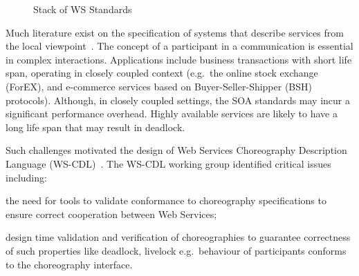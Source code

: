 \documentclass{llncs}
\begin{document}
		\begin{figure}[ht]
		\begin{centering}
		\caption{Stack of WS Standards}
		\label{fig:soa-stack}
		\end{centering}
		\end{figure}

Much literature exist on the specification of systems that describe services from the local viewpoint~\cite{cs-processes,alg-seq-processes}.
The concept of a participant in a communication is essential in complex interactions. Applications include business transactions with short life span, operating in closely coupled context (e.g.\ the online stock exchange (ForEX), and e-commerce services based on Buyer-Seller-Shipper (BSH) protocols). Although, in closely coupled settings, the SOA standards may incur a significant performance overhead.
Highly available services are likely to have a long life span that may result in deadlock.

Such challenges motivated the design of Web Services Choreography Description Language (WS-CDL)~\cite{session-types-sessions}. The WS-CDL working group identified critical issues~\cite{ws-critical-overview} including:
\begin{compactenum}
	\item the need for tools to validate conformance to choreography specifications to ensure correct cooperation between Web Services;
	\item design time validation and verification of choreographies to guarantee correctness of such properties like deadlock, livelock e.g.\ behaviour of participants conforms to the choreography interface.
\end{compactenum}
\end{document}
